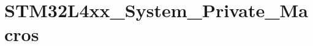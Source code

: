 \hypertarget{group___s_t_m32_l4xx___system___private___macros}{}\section{S\+T\+M32\+L4xx\+\_\+\+System\+\_\+\+Private\+\_\+\+Macros}
\label{group___s_t_m32_l4xx___system___private___macros}
